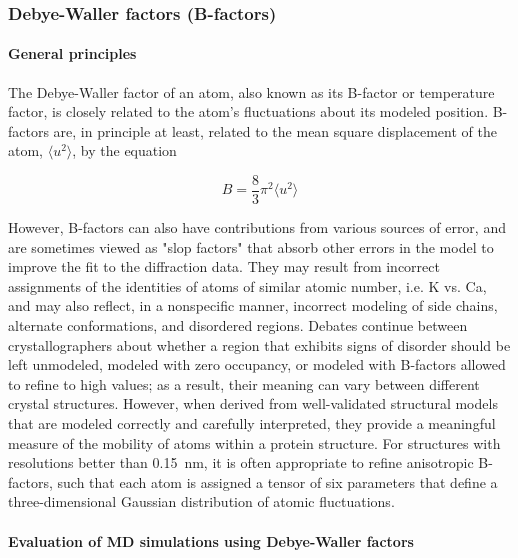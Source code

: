 \documentclass[9pt,review]{livecoms}
\begin{document}
\subsubsection{Debye-Waller factors (B-factors)}
\label{sub2:b_factors}

\paragraph{General principles}

The Debye-Waller factor of an atom, also known as its B-factor or temperature factor, is closely related to the atom’s fluctuations about its modeled position.
B-factors are, in principle at least, related to the mean square displacement of the atom, $\langle u^2 \rangle$, by the equation

\begin{equation}
\label{eqn:b_factor}
B = \frac {8} {3} \pi^2 \langle u^2 \rangle
\end{equation}

\noindent However, B-factors can also have contributions from various sources of error, and are sometimes viewed as "slop factors" that absorb other errors in the model to improve the fit to the diffraction data.
They may result from incorrect assignments of the identities of atoms of similar atomic number, i.e. K vs. Ca, and may also reflect, in a nonspecific manner, incorrect modeling of side chains, alternate conformations, and disordered regions.
Debates continue between crystallographers about whether a region that exhibits signs of disorder should be left unmodeled, modeled with zero occupancy, or modeled with B-factors allowed to refine to high values; as a result, their meaning can vary between different crystal structures.
However, when derived from well-validated structural models \cite{williams_molprobity_2018} that are modeled correctly and carefully interpreted, they provide a meaningful measure of the mobility of atoms within a protein structure.
For structures with resolutions better than \qty{0.15}{\nano\meter}, it is often appropriate to refine anisotropic B-factors, such that each atom is assigned a tensor of six parameters that define a three-dimensional Gaussian distribution of atomic fluctuations.

\paragraph{Evaluation of MD simulations using Debye-Waller factors}
\end{document}
